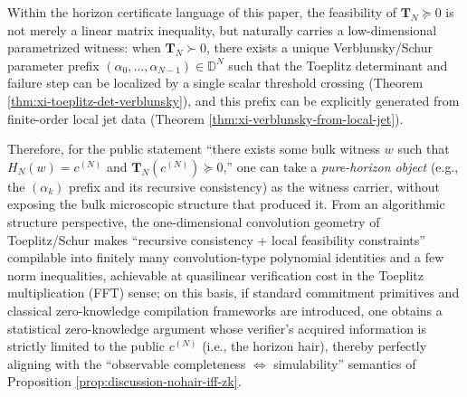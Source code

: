 \begin{remark}\label{rem:discussion-toeplitz-zk-compile}
Within the horizon certificate language of this paper, the feasibility of \(\mathbf{T}_N\succeq 0\) is not merely a linear matrix inequality, but naturally carries a low-dimensional parametrized witness: when \(\mathbf{T}_N\succ 0\), there exists a unique Verblunsky/Schur parameter prefix \((\alpha_0,\dots,\alpha_{N-1})\in\mathbb{D}^{N}\) such that the Toeplitz determinant and failure step can be localized by a single scalar threshold crossing (Theorem \ref{thm:xi-toeplitz-det-verblunsky}), and this prefix can be explicitly generated from finite-order local jet data (Theorem \ref{thm:xi-verblunsky-from-local-jet}).
\par
Therefore, for the public statement ``there exists some bulk witness \(w\) such that \(H_N(w)=c^{(N)}\) and \(\mathbf{T}_N(c^{(N)})\succeq 0\),'' one can take a \emph{pure-horizon object} (e.g., the \((\alpha_k)\) prefix and its recursive consistency) as the witness carrier, without exposing the bulk microscopic structure that produced it.
From an algorithmic structure perspective, the one-dimensional convolution geometry of Toeplitz/Schur makes ``recursive consistency + local feasibility constraints'' compilable into finitely many convolution-type polynomial identities and a few norm inequalities, achievable at quasilinear verification cost in the Toeplitz multiplication (FFT) sense; on this basis, if standard commitment primitives and classical zero-knowledge compilation frameworks are introduced, one obtains a statistical zero-knowledge argument whose verifier's acquired information is strictly limited to the public \(c^{(N)}\) (i.e., the horizon hair), thereby perfectly aligning with the ``observable completeness \(\Leftrightarrow\) simulability'' semantics of Proposition \ref{prop:discussion-nohair-iff-zk}.
\end{remark}

